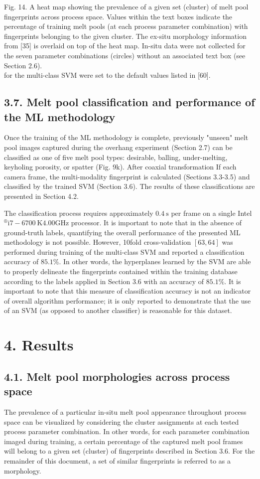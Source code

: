 \documentclass[10pt]{article}
\begin{document}
Fig. 14. A heat map showing the prevalence of a given set (cluster) of melt pool fingerprints across process space. Values within the text boxes indicate the percentage of training melt pools (at each process parameter combination) with fingerprints belonging to the given cluster. The ex-situ morphology information from [35] is overlaid on top of the heat map. In-situ data were not collected for the seven parameter combinations (circles) without an associated text box (see Section 2.6).\\
for the multi-class SVM were set to the default values listed in [60].

\subsection*{3.7. Melt pool classification and performance of the ML methodology}
Once the training of the ML methodology is complete, previously "unseen" melt pool images captured during the overhang experiment (Section 2.7) can be classified as one of five melt pool types: desirable, balling, under-melting, keyholing porosity, or spatter (Fig. 9k). After coaxial transformation If each camera frame, the multi-modality fingerprint is calculated (Sections 3.3-3.5) and classified by the trained SVM (Section 3.6). The results of these classifications are presented in Section 4.2.

The classification process requires approximately $0.4 \mathrm{~s}$ per frame on a single Intel ${ }^{\circledR} \mathrm{i} 7-6700 \mathrm{~K} 4.00 \mathrm{GHz}$ processor. It is important to note that in the absence of ground-truth labels, quantifying the overall performance of the presented ML methodology is not possible. However, 10fold cross-validation $[63,64]$ was performed during training of the multi-class SVM and reported a classification accuracy of $85.1 \%$. In other words, the hyperplanes learned by the SVM are able to properly delineate the fingerprints contained within the training database according to the labels applied in Section 3.6 with an accuracy of $85.1 \%$. It is important to note that this measure of classification accuracy is not an indicator of overall algorithm performance; it is only reported to demonstrate that the use of an SVM (as opposed to another classifier) is reasonable for this dataset.

\section*{4. Results}
\subsection*{4.1. Melt pool morphologies across process space}
The prevalence of a particular in-situ melt pool appearance throughout process space can be visualized by considering the cluster assignments at each tested process parameter combination. In other words, for each parameter combination imaged during training, a certain percentage of the captured melt pool frames will belong to a given set (cluster) of fingerprints described in Section 3.6. For the remainder of this document, a set of similar fingerprints is referred to as a morphology.
\end{document}
